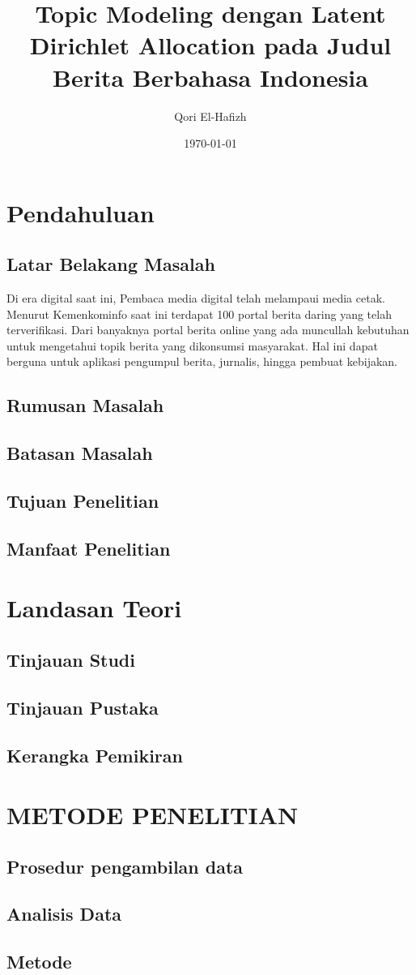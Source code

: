 \documentclass[a4paper,12pt]{report}
\title{Topic Modeling dengan Latent Dirichlet Allocation pada Judul Berita Berbahasa Indonesia}
\author{Qori El-Hafizh}
\date{\today}
\begin{document}
\maketitle

\begin{abstract}
\end{abstract}

\tableofcontents

\chapter{Pendahuluan}
\section{Latar Belakang Masalah}
Di era digital saat ini, Pembaca media digital telah melampaui media cetak.
Menurut Kemenkominfo saat ini terdapat 100 portal berita daring yang telah terverifikasi.
Dari banyaknya portal berita online yang ada muncullah kebutuhan untuk mengetahui topik berita yang dikonsumsi masyarakat.
Hal ini dapat berguna untuk aplikasi pengumpul berita, jurnalis, hingga pembuat kebijakan.
\section{Rumusan Masalah}
\section{Batasan Masalah}
\section{Tujuan Penelitian}
\section{Manfaat Penelitian}

\chapter{Landasan Teori}
\section{Tinjauan Studi}
\section{Tinjauan Pustaka}
\section{Kerangka Pemikiran}

\chapter{METODE PENELITIAN}
\section{Prosedur pengambilan data}
\section{Analisis Data}
\section{Metode}

\printbibliography
\end{document}

